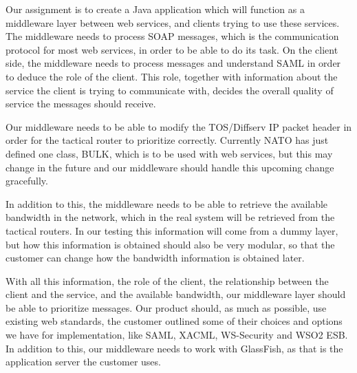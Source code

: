 \documentclass[12pt]{article}
\begin{document}
    Our assignment is to create a Java application which will function as a middleware layer between web services, and clients trying to use these services. The middleware needs to process SOAP messages, which is the communication protocol for most web services, in order to be able to do its task. On the client side, the middleware needs to process messages and understand SAML in order to deduce the role of the client. This role, together with information about the service the client is trying to communicate with, decides the overall quality of service the messages should receive. 

    Our middleware needs to be able to modify the TOS/Diffserv IP packet header in order for the tactical router to prioritize correctly. Currently NATO has just defined one class, BULK, which is to be used with web services, but this may change in the future and our middleware should handle this upcoming change gracefully.

    In addition to this, the middleware needs to be able to retrieve the available bandwidth in the network, which in the real system will be retrieved from the tactical routers. In our testing this information will come from a dummy layer, but how this information is obtained should also be very modular, so that the customer can change how the bandwidth information is obtained later.

    With all this information, the role of the client, the relationship between the client and the service, and the available bandwidth, our middleware layer should be able to prioritize messages. Our product should, as much as possible, use existing web standards, the customer outlined some of their choices and options we have for implementation, like SAML, XACML, WS-Security and WSO2 ESB. In addition to this, our middleware needs to work with GlassFish, as that is the application server the customer uses.
   
\end{document}
